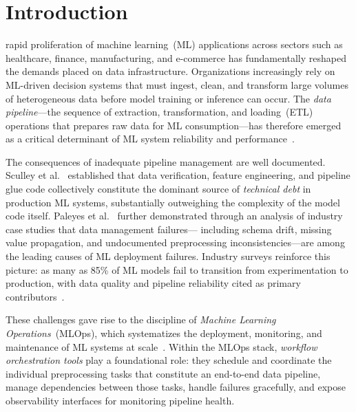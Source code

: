 \documentclass[journal]{IEEEtran}
\begin{document}
\section{Introduction}
\label{sec:introduction}

 rapid proliferation of machine learning~(ML)
applications across sectors such as healthcare, finance, manufacturing,
and e-commerce has fundamentally reshaped the demands placed on data
infrastructure. Organizations increasingly rely on ML-driven decision
systems that must ingest, clean, and transform large volumes of
heterogeneous data before model training or inference can occur. The
\textit{data pipeline}---the sequence of extraction, transformation, and
loading~(ETL) operations that prepares raw data for ML consumption---has
therefore emerged as a critical determinant of ML system reliability and
performance~\cite{sculley2015hidden}.

The consequences of inadequate pipeline management are well documented.
Sculley et al.~\cite{sculley2015hidden} established that data verification,
feature engineering, and pipeline glue code collectively constitute the
dominant source of \textit{technical debt} in production ML systems,
substantially outweighing the complexity of the model code itself.
Paleyes et al.~\cite{paleyes2023challenges} further demonstrated through
an analysis of industry case studies that data management failures---
including schema drift, missing value propagation, and undocumented
preprocessing inconsistencies---are among the leading causes of ML
deployment failures. Industry surveys reinforce this picture: as many as
85\% of ML models fail to transition from experimentation to production,
with data quality and pipeline reliability cited as primary
contributors~\cite{kreuzberger2023mlops}.

These challenges gave rise to the discipline of \textit{Machine Learning
Operations}~(MLOps), which systematizes the deployment, monitoring, and
maintenance of ML systems at scale~\cite{kreuzberger2023mlops,
symeonidis2022mlops, amershi2019software}. Within the MLOps stack,
\textit{workflow orchestration tools} play a foundational role: they
schedule and coordinate the individual preprocessing tasks that constitute
an end-to-end data pipeline, manage dependencies between those tasks,
handle failures gracefully, and expose observability interfaces for
monitoring pipeline health.
\end{document}
